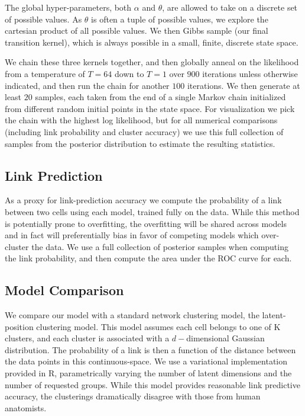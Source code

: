 \documentclass{article}
\begin{document}
The global hyper-parameters, both $\alpha$ and $\theta$, are allowed
to take on a discrete set of possible values. As $\theta$ is often a
tuple of possible values, we explore the cartesian product of all
possible values. We then Gibbs sample (our final transition kernel),
which is always possible in a small, finite, discrete state space.

We chain these three kernels together, and then globally anneal on the
likelihood from a temperature of $T=64$ down to $T=1$ over $900$
iterations unless otherwise indicated, and then run the chain for
another $100$ iterations. We then generate at least $20$ samples, each
taken from the end of a single Markov chain initialized from different
random initial points in the state space. For visualization we pick the
chain with the highest log likelihood, but for all numerical
comparisons (including link probability and cluster accuracy) we use this full
collection of samples from the posterior distribution to estimate the
resulting statistics.

\subsection*{Link Prediction}
As a proxy for link-prediction accuracy we compute the probability of a link
between two cells using each model, trained fully on the data. While this method
is potentially prone to overfitting, the overfitting will be shared across models
and in fact will preferentially bias in favor of competing models
which over-cluster the data. We use a full collection of posterior samples when
computing the link probability, and then compute the area under the ROC curve for
each. 

\subsection*{Model Comparison}
We compare our model with a standard network clustering model, the
latent-position clustering model. This model assumes each cell belongs
to one of K clusters, and each cluster is associated with a
$d-$dimensional Gaussian distribution. The probability of a link is
then a function of the distance between the data points in this
continuous-space. We use \autocite{Salter-Townshend2013} a variational
implementation provided in R, parametrically varying the number of
latent dimensions and the number of requested groups.  While this
model provides reasonable link predictive accuracy, the clusterings
dramatically disagree with those from human anatomists.
\end{document}
